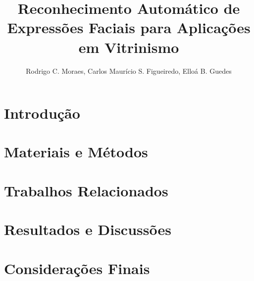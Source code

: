 \documentclass[12pt]{article}
\title{Reconhecimento Automático de Expressões Faciais para Aplicações em Vitrinismo}
\author{Rodrigo C. Moraes, Carlos Maurício S. Figueiredo, Elloá B. Guedes \email{\{rcm, cfigueiredo, ebgcosta\}.eng@uea.edu.br}
}
\begin{document}
\maketitle




\section{Introdução}




\section{Materiais e Métodos}


\section{Trabalhos Relacionados}


\section{Resultados e Discussões}


\section{Considerações Finais}





\end{document}
